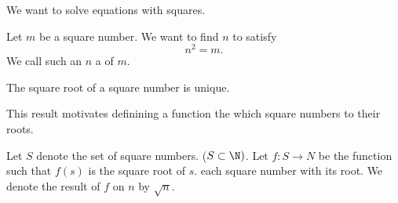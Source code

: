 

We want to solve equations
with squares.


Let $m$ be a square number.
We want to find $n$ to satisfy
\[
  n^2 = m.
\]
We call such an $n$ a
of $m$.

\begin{prop}
The square root of a square
number is unique.
\end{prop}

This result motivates
definining a function
the
which square numbers
to their roots.


Let $S$ denote the set
of square numbers.
($S \subset \N)$.
Let $f: S \to N$ be
the function such that
$f(s)$ is the square root
of $s$.
each square number
with its root.
We denote
the result of $f$ on $n$
by $\sqrt{n}$.
